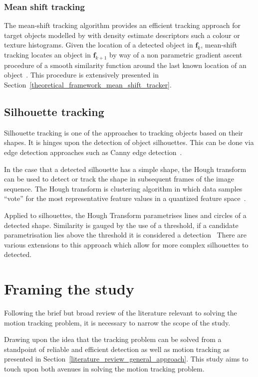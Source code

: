 \subsubsection{Mean shift tracking}\label{literature_review_mean_shift}
The mean-shift tracking algorithm provides an efficient tracking approach for
target objects modelled by with density estimate descriptors such a colour or
texture histograms. 
Given the location of a detected object in $\mathbf{f}_k$, mean-shift tracking
locates an object in $\mathbf{f}_{k+1}$ by way of a
non parametric gradient ascent procedure of a smooth similarity function around
the last known location of an object~\cite{Comaniciu2003}. This procedure is
extensively presented in Section~\ref{theoretical_framework_mean_shift_tracker}.

\subsection{Silhouette tracking}
Silhouette tracking is one of the approaches to tracking objects based on their
shapes. It is hinges upon the detection of object silhouettes.  This can be done
via edge detection approaches such as Canny edge
detection~\cite{Delprado2013}.

In the case that a detected silhouette has a simple shape, the Hough transform
can be used to detect or track the shape in subsequent frames of the image
sequence. The Hough transform is clustering algorithm in which data samples
“vote” for the most representative feature values in a quantized feature
space~\cite{Tekalp2014}. 

Applied to silhouettes, the Hough Transform parametrises lines and circles of a
detected shape. Similarity is gauged by the use of a threshold, if a candidate
parametrisation lies above the threshold it is considered a
detection~\cite{Delprado2013} There are various extensions to this approach
which allow for more complex silhouettes to detected. 

\section{Framing the study}\label{literature_review}
Following the brief but broad review of the literature relevant to solving the
motion tracking problem, it is necessary to narrow the scope of the study.

Drawing upon the idea that the tracking problem can be solved from a standpoint
of reliable and efficient detection as well as motion tracking as presented in
Section~\ref{literature_review_general_approach}. This study aims to touch upon
both avenues in solving the motion tracking problem.

